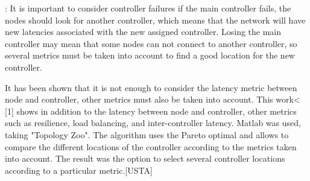 \documentclass[a4paper,10pt]{article}
\begin{document}
\cite{HoGe14}: It is important to consider controller failures if the main controller fails, the nodes should look for another controller, which means that the network will have new latencies associated with the new assigned controller. Losing the main controller may mean that some nodes can not connect to another controller, so several metrics must be taken into account to find a good location for the new controller.

It has been shown that it is not enough to consider the latency metric between node and controller, other metrics must also be taken into account. This work< [1] shows in addition to the latency between node and controller, other metrics such as resilience, load balancing, and inter-controller latency. Matlab was used, taking "Topology Zoo". The algorithm uses the Pareto optimal and allows to compare the different locations of the controller according to the metrics taken into account. The result was the option to select several controller locations according to a particular metric.[USTA]
\end{document}
